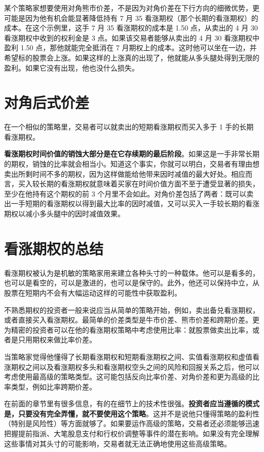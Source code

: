 某个策略家想要使用对角熊市价差，不是因为对角价差在下行方向的细微优势，更可能是因为他有机会能显著降低持有 7 月 35 看涨期权（那个长期的看涨期权）的成本。在这个示例里，这手 7 月 35 看涨期权的成本是 1.50 点，从卖出的 4 月 30 看涨期权中收到的权利金是 3 点。如果该交易者能够从卖出的 4 月 30 看涨期权中盈利 1.50 点，那他就能完全抵消在 7 月期权上的成本。这时他可以坐在一边，并希望标的股票会上涨。如果这样的上涨真的出现了，他就能从多头腿处得到无限的盈利。如果它没有出现，他也没什么损失。
\section{对角后式价差}
在一个相似的策略里，交易者可以就卖出的短期看涨期权而买入多于 1 手的长期看涨期权。

\textbf{看涨期权时间价值的销蚀大部分是在它存续期的最后阶段}。如果这是一手非常长期的期权，销蚀的比率就会相当小。知道这个事实，你就可以明白，交易者有理由想卖出所剩时间不多的期权，因为这样做能给他带来因时减值的最大好处。相应而言，买入较长期的看涨期权就意味着买家在时间价值方面不至于遭受显著的损失，至少在他持有这个期权的前 3 个月里不会如此。对角价差包括了两者：既可以卖出一手短期的看涨期权以得到最大比率的因时减值，又可以买入一手较长期的看涨期权以减小多头腿中的因时减值效果。
\section{看涨期权的总结}
看涨期权被认为是机敏的策略家用来建立各种头寸的一种载体。他可以是看多的，也可以是看空的，可以是激进的，也可以是保守的。此外，他还可以保持中立，从股票在短期内不会有大幅运动这样的可能性中获取盈利。

不熟悉期权的投资者一般来说应当从简单的策略开始，例如，卖出备兑看涨期权，或者直接买入看涨期权。最简单的价差类型是牛市价差、熊市价差和跨期价差。更为精密的投资者可以在他的看涨期权策略中考虑使用比率：就股票做卖出比率，或者是只用期权来做比率价差。

当策略家觉得他懂得了长期看涨期权和短期看涨期权之间、实值看涨期权和虚值看涨期权之间以及看涨期权多头和看涨期权空头之间的风险和回报关系之后，他可以考虑使用最高级的策略类型。这可能包括反向比率价差、对角价差和更为高级的比率类型，例如比率跨期价差。

在前面的章节里有很多信息，有的在细节上的技术性很强。\textbf{投资者应当遵循的模式是，只要没有完全弄懂，就不要使用这个策略}。这并不是说他只懂得策略的盈利性（特别是风险性）等方面就够了。如果要运作高级的策略，交易者还必须能够迅速把握提前指派、大笔股息支付和行权价调整等事件的潜在影响。如果没有完全理解这些事情对其头寸的可能影响，交易者就无法正确地使用这些高级策略。